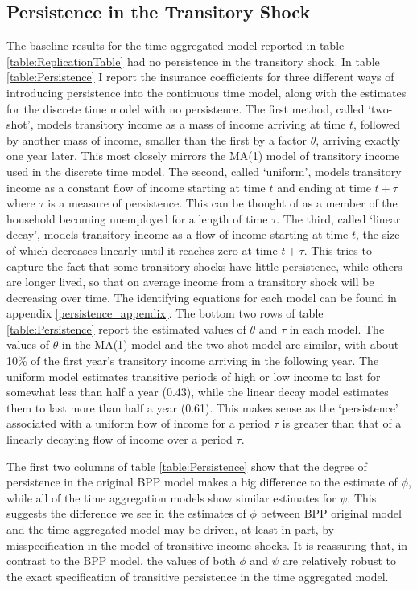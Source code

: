 \documentclass[titlepage]{\econtex}\newcommand{\texname}{BPP_TimeAgg}
\begin{document}


\subsection{Persistence in the Transitory Shock} \label{persistence}
The baseline results for the time aggregated model reported in table \ref{table:ReplicationTable} had no persistence in the transitory shock. In table \ref{table:Persistence} I report the insurance coefficients for three different ways of introducing persistence into the continuous time model, along with the estimates for the discrete time model with no persistence. The first method, called `two-shot', models transitory income as a mass of income arriving at time $t$, followed by another mass of income, smaller than the first by a factor $\theta$, arriving exactly one year later. This most closely mirrors the MA(1) model of transitory income used in the discrete time model. The second, called `uniform', models transitory income as a constant flow of income starting at time $t$ and ending at time $t+\tau$ where $\tau$ is a measure of persistence. This can be thought of as a member of the household becoming unemployed for a length of time $\tau$. The third, called `linear decay', models transitory income as a flow of income starting at time $t$, the size of which decreases linearly until it reaches zero at time $t+\tau$. This tries to capture the fact that some transitory shocks have little persistence, while others are longer lived, so that on average income from a transitory shock will be decreasing over time. The identifying equations for each model can be found in appendix \ref{persistence_appendix}. The bottom two rows of table \ref{table:Persistence} report the estimated values of $\theta$ and $\tau$ in each model. The values of $\theta$ in the MA(1) model and the two-shot model are similar, with about 10\% of the first year's transitory income arriving in the following year. The uniform model estimates transitive periods of high or low income to last for somewhat less than half a year (0.43), while the linear decay model estimates them to last more than half a year (0.61). This makes sense as the `persistence' associated with a uniform flow of income for a period $\tau$ is greater than that of a linearly decaying flow of income over a period $\tau$.

The first two columns of table \ref{table:Persistence} show that the degree of persistence in the original BPP model makes a big difference to the estimate of $\phi$, while all of the time aggregation models show similar estimates for $\psi$. This suggests the difference we see in the estimates of $\phi$ between BPP original model and the time aggregated model may be driven, at least in part, by misspecification in the model of transitive income shocks. It is reassuring that, in contrast to the BPP model, the values of both $\phi$ and $\psi$ are relatively robust to the exact specification of transitive persistence in the time aggregated model.
\end{document}
